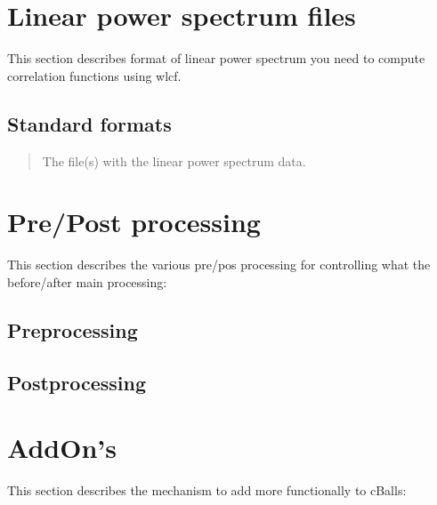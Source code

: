 \documentclass[letterpaper,10pt,english]{sphinxmanual}
\begin{document}
\sphinxstepscope


\chapter{Linear power spectrum files}
\label{\detokenize{ps_files:linear-power-spectrum-files}}\label{\detokenize{ps_files::doc}}
\sphinxAtStartPar
This section describes format of linear power spectrum you need to compute correlation functions using wlcf.


\section{Standard formats}
\label{\detokenize{ps_files:standard-formats}}\begin{quote}\begin{description}
\sphinxAtStartPar
The file(s) with the linear power spectrum data.

\end{description}\end{quote}

\sphinxstepscope


\chapter{Pre/Post processing}
\label{\detokenize{pre_post_process:pre-post-processing}}\label{\detokenize{pre_post_process::doc}}
\sphinxAtStartPar
This section describes the various pre/pos processing for controlling
what the  before/after main processing:


\section{Pre\sphinxhyphen{}processing}
\label{\detokenize{pre_post_process:pre-processing}}

\section{Post\sphinxhyphen{}processing}
\label{\detokenize{pre_post_process:post-processing}}
\sphinxstepscope


\chapter{AddOn’s}
\label{\detokenize{addons:addon-s}}\label{\detokenize{addons::doc}}
\sphinxAtStartPar
This section describes the mechanism to add more functionally to cBalls:
\end{document}
